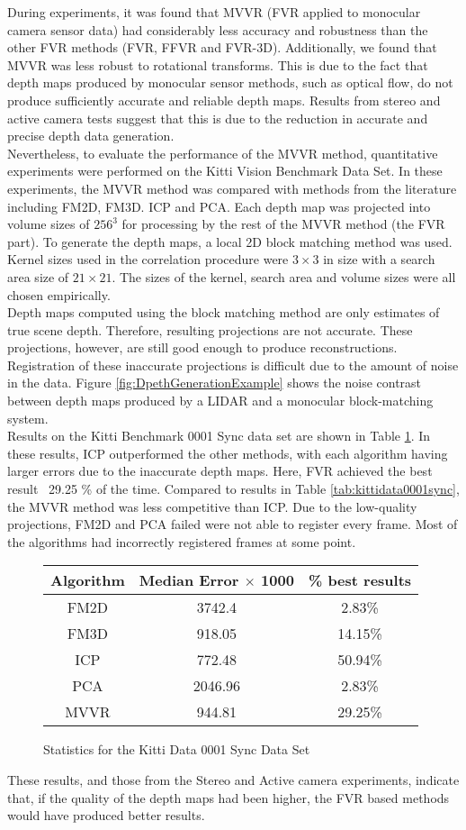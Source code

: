 
During experiments, it was found that MVVR (FVR applied to monocular camera sensor data) had considerably less accuracy and robustness than the other FVR methods (FVR, FFVR and FVR-3D). Additionally, we found that MVVR was less robust to rotational transforms. This is due to the fact that depth maps produced by monocular sensor methods, such as optical flow, do not produce sufficiently accurate and reliable depth maps. Results from stereo and active camera tests suggest that this is due to the reduction in accurate and precise depth data generation. \\

Nevertheless, to evaluate the performance of the MVVR method, quantitative experiments were performed on the Kitti Vision Benchmark Data Set. In these experiments, the MVVR method was compared with methods from the literature including FM2D, FM3D. ICP and PCA. Each depth map was projected into volume sizes of $256^3$ for processing by the rest of the MVVR method (the FVR part). To generate the depth maps, a local 2D block matching method was used. Kernel sizes used in the correlation procedure were $3 \times 3$ in size with a search area size of $21 \times 21$. The sizes of the kernel, search area and volume sizes were all chosen empirically. \\

Depth maps computed using the block matching method are only estimates of true scene depth. Therefore, resulting projections are not accurate. These projections, however, are still good enough to produce reconstructions. Registration of these inaccurate projections is difficult due to the amount of noise in the data. Figure \ref{fig:DpethGenerationExample} shows the noise contrast between depth maps produced by a LIDAR and a monocular block-matching system. \\

Results on the Kitti Benchmark 0001 Sync data set are shown in Table \ref{table:MVVRQuantitativeExperimentResults}. In these results, ICP outperformed the other methods, with each algorithm having larger errors due to the inaccurate depth maps. Here, FVR achieved the best result ~29.25 \% of the time. Compared to results in Table \ref{tab:kittidata0001sync}, the MVVR method was less competitive than ICP. Due to the low-quality projections, FM2D and PCA failed were not able to register every frame. Most of the algorithms had incorrectly registered frames at some point.

\begin{figure}
\centering
\begin{tabular}{ccc}
\hline
\textbf{Algorithm} & \textbf{Median Error $\times$ 1000} & \textbf{\% best results}\\ \hline
FM2D	& 3742.4 & 2.83\%\\
FM3D	& 918.05 & 14.15\%\\
ICP	& 772.48 & 50.94\%\\
PCA	& 2046.96 & 2.83\%\\
MVVR	& 944.81 & 29.25\%\\
\end{tabular}
\caption{Statistics for the Kitti Data 0001 Sync Data Set}
\label{table:MVVRQuantitativeExperimentResults}
\end{figure} 

These results, and those from the Stereo and Active camera experiments, indicate that, if the quality of the depth maps had been higher, the FVR based methods would have produced better results. \\

